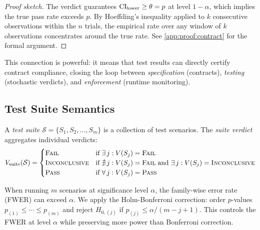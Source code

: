 \begin{proof}[Proof sketch]
The \PASS{} verdict guarantees $\mathrm{CI}_{\text{lower}} \geq \theta = p$ at
level $1-\alpha$, which implies the true pass rate exceeds $p$. By
Hoeffding's inequality applied to $k$ consecutive observations within the
$n$ trials, the empirical rate over any window of $k$ observations
concentrates around the true rate. See \cref{app:proof:contract} for the
formal argument.
\end{proof}

This connection is powerful: it means that \agentassay{} test results
can directly certify contract compliance, closing the loop between
\emph{specification} (contracts), \emph{testing} (stochastic verdicts),
and \emph{enforcement} (runtime monitoring).

\subsection{Test Suite Semantics}
\label{sec:stochastic:suite}

\begin{definition}
\label{def:suite}
A \emph{test suite} $\mathcal{S} = \{S_1, S_2, \ldots, S_m\}$ is a
collection of test scenarios. The \emph{suite verdict} aggregates
individual verdicts:
\begin{equation}
\label{eq:suite-verdict}
  V_{\text{suite}}(\mathcal{S}) =
  \begin{cases}
    \textsc{Fail} & \text{if } \exists\, j : V(S_j) = \textsc{Fail} \\
    \textsc{Inconclusive} & \text{if } \nexists\, j : V(S_j) = \textsc{Fail} \text{ and }
      \exists\, j : V(S_j) = \textsc{Inconclusive} \\
    \textsc{Pass} & \text{if } \forall\, j : V(S_j) = \textsc{Pass}
  \end{cases}
\end{equation}
\end{definition}

\begin{remark}
When running $m$ scenarios at significance level $\alpha$, the
family-wise error rate (FWER) can exceed $\alpha$. We apply the
Holm-Bonferroni correction: order $p$-values $p_{(1)} \leq \cdots \leq
p_{(m)}$ and reject $H_{0,(j)}$ if
$p_{(j)} \leq \alpha / (m - j + 1)$. This controls the FWER at level
$\alpha$ while preserving more power than Bonferroni correction.
\end{remark}
